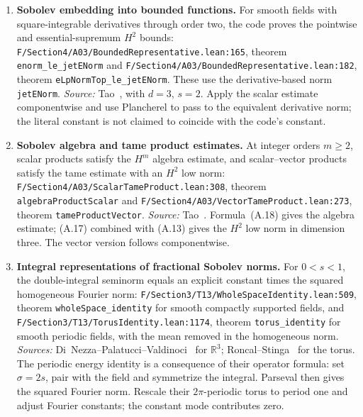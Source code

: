 \documentclass[11pt,a4paper]{article}
\newcommand{\code}[1]{\nolinkurl{#1}}
\newcommand{\source}[4]{\code{#1.lean:#2}, #4 \code{#3}}
\begin{document}
\begin{enumerate}[leftmargin=*,itemsep=5pt]
\item \textbf{Sobolev embedding into bounded functions.}
For smooth fields with square-integrable derivatives through order two,
the code proves the pointwise and essential-supremum $H^2$ bounds:
\source{F/Section4/A03/BoundedRepresentative}{165}{enorm_le_jetENorm}{theorem}
and \source{F/Section4/A03/BoundedRepresentative}{182}{eLpNormTop_le_jetENorm}{theorem}.
These use the derivative-based norm \code{jetENorm}.
\emph{Source:} Tao~\cite[Appendix~A, (A.13), draft p.~336]{taodispersive},
with $d=3$, $s=2$. Apply the scalar estimate componentwise and use Plancherel
to pass to the equivalent derivative norm; the literal constant is not claimed
to coincide with the code's constant.

\item \textbf{Sobolev algebra and tame product estimates.}
At integer orders $m\ge2$, scalar products satisfy the $H^m$ algebra estimate,
and scalar--vector products satisfy the tame estimate with an $H^2$ low norm:
\source{F/Section4/A03/ScalarTameProduct}{308}{algebraProductScalar}{theorem}
and \source{F/Section4/A03/VectorTameProduct}{273}{tameProductVector}{theorem}.
\emph{Source:} Tao~\cite[Appendix~A, Lemma~A.8, (A.17)--(A.18),
draft p.~338]{taodispersive}. Formula~(A.18) gives the algebra estimate;
(A.17) combined with (A.13) gives the $H^2$ low norm in dimension three.
The vector version follows componentwise.

\item \textbf{Integral representations of fractional Sobolev norms.}
For $0<s<1$, the double-integral seminorm equals an explicit constant times
the squared homogeneous Fourier norm:
\source{F/Section3/T13/WholeSpaceIdentity}{509}{wholeSpace_identity}{theorem}
for smooth compactly supported fields, and
\source{F/Section3/T13/TorusIdentity}{1174}{torus_identity}{theorem}
for smooth periodic fields, with the mean removed in the homogeneous norm.
\emph{Sources:} Di~Nezza--Palatucci--Valdinoci~\cite[Proposition~3.4,
arXiv v3, pp.~16--17]{dpv} for $\mathbb R^3$; Roncal--Stinga~\cite[arXiv v3, Theorem~1.5,
(1.6)--(1.8), p.~3; Fourier definition (1.1), p.~1]{roncal} for the torus.
The periodic energy identity is a consequence of their operator formula:
set $\sigma=2s$, pair with the field and symmetrize the integral. Parseval
then gives the squared Fourier norm. Rescale their $2\pi$-periodic torus
to period one and adjust Fourier constants; the constant mode contributes zero.


\end{enumerate}
\end{document}
